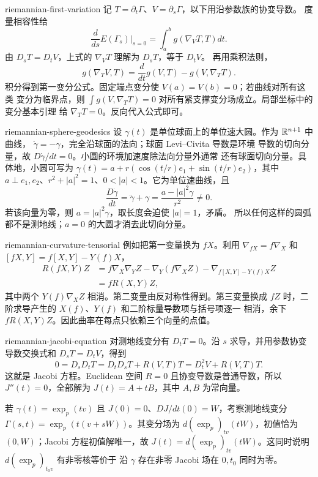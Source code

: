 \begin{solution}{riemannian-first-variation}
记 $T=\partial_t\Gamma$、$V=\partial_s\Gamma$，以下用沿参数族的协变导数。
度量相容性给
\[
 \frac d{ds}E(\Gamma_s)\bigg|_{s=0}
 =\int_a^bg(\nabla_VT,T)dt.
\]
由 $D_sT=D_tV$，上式的 $\nabla_VT$ 理解为 $D_sT$，等于 $D_tV$。
再用乘积法则，
\[
 g(\nabla_TV,T)=\frac d{dt}g(V,T)-g(V,\nabla_TT).
\]
积分得到第一变分公式。固定端点变分使 $V(a)=V(b)=0$；若曲线对所有这类
变分为临界点，则
$\int g(V,\nabla_TT)=0$ 对所有紧支撑变分场成立。局部坐标中的变分基本引理
给 $\nabla_TT=0$。反向代入公式即可。
\end{solution}

\begin{solution}{riemannian-sphere-geodesics}
设 $\gamma(t)$ 是单位球面上的单位速大圆。作为 $\mathbb{R}^{n+1}$ 中曲线，
$\ddot\gamma=-\gamma$，完全沿球面的法向；球面 Levi--Civita 导数是环境
导数的切向分量，故 $D\dot\gamma/dt=0$。小圆的环境加速度除法向分量外通常
还有球面切向分量。具体地，小圆可写为
$\gamma(t)=a+r(\cos(t/r)e_1+\sin(t/r)e_2)$，其中
$a\perp e_1,e_2$、$r^2+|a|^2=1$、$0<|a|<1$。它为单位速曲线，且
\[
 \frac{D\dot\gamma}{dt}
 =\ddot\gamma+\gamma
 =\frac{a-|a|^2\gamma}{r^2}\ne0.
\]
若该向量为零，则 $a=|a|^2\gamma$，取长度会迫使 $|a|=1$，矛盾。
所以任何这样的圆弧都不是测地线；$a=0$ 的大圆才消去此切向分量。
\end{solution}

\begin{solution}{riemannian-curvature-tensorial}
例如把第一变量换为 $fX$。利用
$\nabla_{fX}=f\nabla_X$ 和
$[fX,Y]=f[X,Y]-Y(f)X$，
\begin{align*}
 R(fX,Y)Z
 &=f\nabla_X\nabla_YZ-\nabla_Y(f\nabla_XZ)
   -\nabla_{f[X,Y]-Y(f)X}Z\\
 &=fR(X,Y)Z,
\end{align*}
其中两个 $Y(f)\nabla_XZ$ 相消。第二变量由反对称性得到。第三变量换成
$fZ$ 时，二阶求导产生的 $X(f)$、$Y(f)$ 和二阶标量导数项与括号项逐一
相消，余下 $fR(X,Y)Z$。因此曲率在每点只依赖三个向量的点值。
\end{solution}

\begin{solution}{riemannian-jacobi-equation}
对测地线变分有 $D_tT=0$。沿 $s$ 求导，并用参数协变导数交换式和
$D_sT=D_tV$，得到
\[
 0=D_sD_tT=D_tD_sT+R(V,T)T=D_t^2V+R(V,T)T.
\]
这就是 Jacobi 方程。Euclidean 空间 $R=0$ 且协变导数是普通导数，所以
$J''(t)=0$，全部解为 $J(t)=A+tB$，其中 $A,B$ 为常向量。

若 $\gamma(t)=\exp_p(tv)$ 且 $J(0)=0$、$DJ/dt(0)=W$，考察测地线变分
$\Gamma(s,t)=\exp_p(t(v+sW))$。其变分场为
$d(\exp_p)_{tv}(tW)$，初值恰为 $(0,W)$；Jacobi 方程初值解唯一，故
$J(t)=d(\exp_p)_{tv}(tW)$。这同时说明 $d(\exp_p)_{t_0v}$ 有非零核等价于
沿 $\gamma$ 存在非零 Jacobi 场在 $0,t_0$ 同时为零。
\end{solution}

